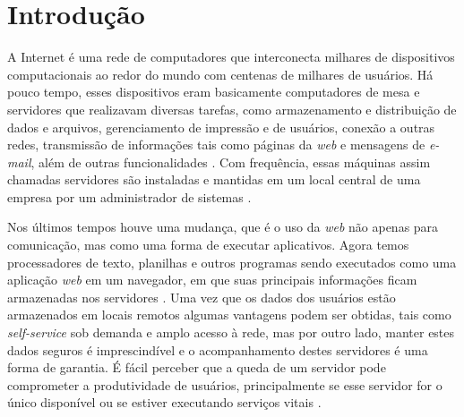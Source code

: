 

\chapter{Introdução} \label{Cap:Introducao}

A Internet é uma rede de computadores que interconecta milhares de dispositivos computacionais ao redor do mundo com centenas de milhares de usuários. Há pouco tempo, esses dispositivos eram basicamente computadores de mesa e servidores que realizavam diversas tarefas, como armazenamento e distribuição de dados e arquivos, gerenciamento de impressão e de usuários, conexão a outras redes, transmissão de informações tais como páginas da \textit{web} e mensagens de \textit{e-mail}, além de outras funcionalidades \cite{Kurose:2010}. Com frequência, essas máquinas assim chamadas servidores são instaladas e mantidas em um local central de uma empresa por um administrador de sistemas \cite{Tanenbaum:2003}. 

Nos últimos tempos houve uma mudança, que é o uso da \textit{web} não apenas para comunicação, mas como uma forma de executar aplicativos.  Agora temos processadores de texto, planilhas e outros programas sendo executados como uma aplicação \textit{web} em um navegador, em que suas principais informações ficam armazenadas nos servidores \cite{Marimoto:2011}. Uma vez que os dados dos usuários estão armazenados em locais remotos algumas vantagens podem ser obtidas, tais como \textit{self-service} sob demanda e amplo acesso à rede, \cite{Sampaio:2003}  mas por outro lado, manter estes dados seguros é imprescindível e o acompanhamento destes servidores é uma forma de garantia. É fácil perceber que a queda de um servidor pode comprometer a produtividade de usuários, principalmente se esse servidor for o único disponível ou se estiver executando serviços vitais \cite{Weber:2002}.

